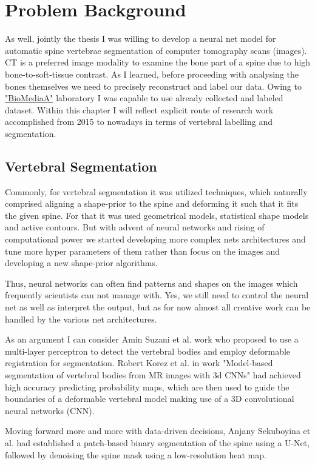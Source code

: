 \chapter{Problem Background}
\label{ch:problem_background}
As well, jointly the thesis I was willing to develop a neural net model for automatic spine vertebrae segmentation of computer tomography scans (images). CT is a preferred image modality to examine the bone part of a spine due to high bone-to-soft-tissue contrast. As I learned, before proceeding with analysing the bones themselves we need to precisely reconstruct and label our data. Owing to \href{https://biomedia.doc.ic.ac.uk/}{\color{blue}"BioMediaA"} laboratory I was capable to use already collected and labeled dataset. Within this chapter I will reflect explicit route of research work accomplished from 2015 to nowadays in terms of vertebral labelling and segmentation.            

\section{Vertebral Segmentation}
Commonly, for vertebral segmentation it was utilized techniques, which naturally comprised aligning a shape-prior to the spine and deforming it such that it fits the given spine. For that it was used geometrical models,  statistical shape models and active contours. But with advent of neural networks and rising of computational power we started developing more complex nets architectures and tune more hyper parameters of them rather than focus on the images and developing a new shape-prior algorithms. 

Thus, neural networks can often find patterns and shapes on the images which frequently scientists can not manage with. Yes, we still need to control the neural net as well as interpret the output, but as for now almost all creative work can be handled by the various net architectures.

As an argument I can consider Amin Suzani et al. work \cite{Suzani2015} who proposed to use a multi-layer perceptron to detect the vertebral bodies and employ deformable registration for segmentation. Robert Korez et al. \cite{Korez2016} in work "Model-based segmentation of vertebral bodies from MR images with 3d CNNs" had achieved high accuracy predicting probability maps, which are then used to guide the boundaries of a deformable vertebral model making use of a 3D convolutional neural networks (CNN). 

Moving forward more and more with data-driven decisions, Anjany Sekuboyina et al. \cite{Sekuboyina2018} had established a patch-based binary segmentation of the spine using a U-Net, followed by denoising the spine mask using a low-resolution heat map.

